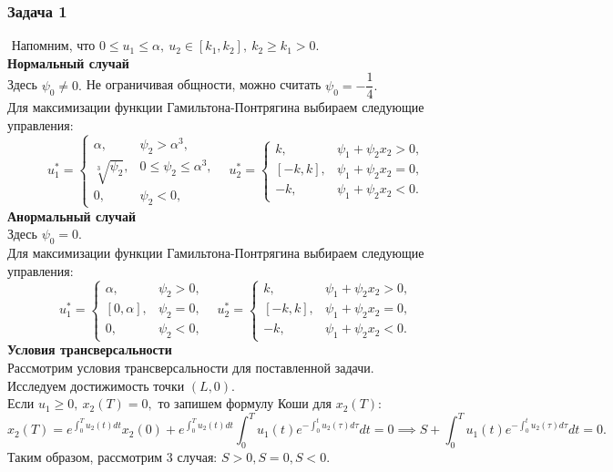 \documentclass{article}
\begin{document}
\subsubsection{Задача 1}
$\label{subsub:1}$
Напомним, что $0 \leqslant u_1 \leqslant \alpha, ~ u_2 \in [k_1, k_2], ~k_2 \geqslant k_1 > 0.$\\
\textbf{Нормальный случай}\\
Здесь $\psi_0\neq0.$ Не ограничивая общности, можно считать $\psi_0 = -\dfrac{1}{4}.$\\
Для максимизации функции Гамильтона-Понтрягина выбираем следующие управления:
$$
u_1^* = 
\begin{cases}
    \alpha, & \psi_2 > \alpha^3, \\
    \sqrt[3]{\psi_2}, & 0 \leqslant \psi_2 \leqslant \alpha^3, \\
    0, & \psi_2 < 0,
\end{cases}
~~~~
u_2^* = 
\begin{cases}
    k, & \psi_1 + \psi_2 x_2 > 0, \\
    [-k, k], & \psi_1 + \psi_2 x_2 = 0, \\
    -k, & \psi_1 + \psi_2 x_2 < 0.
\end{cases}
$$
\textbf{Анормальный случай}\\
Здесь $\psi_0=0.$\\
Для максимизации функции Гамильтона-Понтрягина выбираем следующие управления:
$$
u_1^* = 
\begin{cases}
    \alpha, &\psi_2 >0, \\
    [0, \alpha], &\psi_2=0,\\
    0, &\psi_2 < 0,
\end{cases}
~~~~
u_2^* = 
\begin{cases}
    k, &\psi_1 +\psi_2x_2>0, \\
    [-k, k], &\psi_1 +\psi_2x_2=0,\\
    -k, &\psi_1 +\psi_2x_2<0.
\end{cases}
$$
\textbf{Условия трансверсальности}\\
Рассмотрим условия трансверсальности для поставленной задачи. \\
Исследуем достижимость точки $(L, 0)$. \\
Если $u_1\geqslant 0,~ x_2(T) = 0,$ то запишем формулу Коши для $x_2(T)$:
$$x_2(T) = e^{\int_0^T u_2(t) dt} x_2(0) + e^{\int_0^T u_2(t) dt} \int_0^T u_1(t) e^{-\int_0^t u_2(\tau) d\tau} dt = 0 \implies S + \int_0^T u_1(t) e^{-\int_0^t u_2(\tau) d\tau} dt = 0.$$
Таким образом, рассмотрим 3 случая: $S> 0,S = 0,  S <0.$\\
\end{document}
